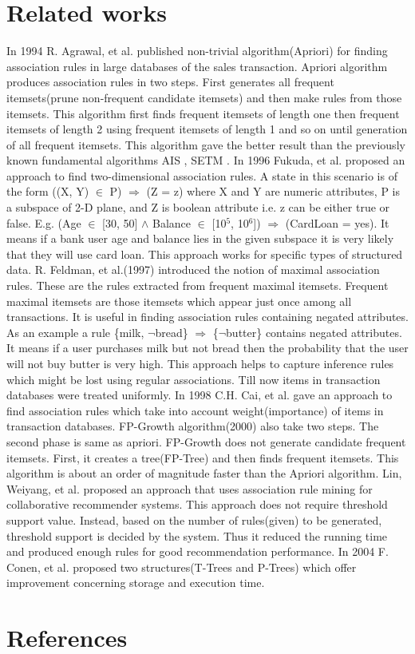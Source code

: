 \documentclass[review]{elsarticle}
\begin{document}
\section{Related works}
In 1994 R. Agrawal, et al. published non-trivial algorithm(Apriori) \cite{fastapriori} for finding association rules in large databases of the sales transaction. Apriori algorithm produces association rules in two steps. First generates all frequent itemsets(prune non-frequent candidate itemsets) and then make rules from those itemsets. This algorithm first finds frequent itemsets of length one then frequent itemsets of length 2 using frequent itemsets of length 1 and so on until generation of all frequent itemsets. This algorithm gave the better result than the previously known fundamental algorithms AIS \cite{ais}, SETM \citep{setm}. In 1996 Fukuda, et al. \cite{2darules} proposed an approach to find two-dimensional association rules. A state in this scenario is of the form ((X, Y) $\in$ P) $\Rightarrow$ (Z = z) where X and Y are numeric attributes, P is a subspace of 2-D plane, and Z is boolean attribute i.e. z can be either true or false. E.g. (Age $\in$ [30, 50] $\wedge$ Balance $\in$ [10$^{5}$, 10$^{6}$]) $\Rightarrow$ (CardLoan = yes). It means if a bank user age and balance lies in the given subspace it is very likely that they will use card loan. This approach works for specific types of structured data. R. Feldman, et al.(1997) \cite{massociation} introduced the notion of maximal association rules. These are the rules extracted from frequent maximal itemsets. Frequent maximal itemsets are those itemsets which appear just once among all transactions. It is useful in finding association rules containing negated attributes. As an example a rule \{milk, $\neg$bread\} $\Rightarrow$ \{$\neg$butter\} contains negated attributes. It means if a user purchases milk but not bread then the probability that the user will not buy butter is very high. This approach helps to capture inference rules which might be lost using regular associations. Till now items in transaction databases were treated uniformly. In 1998 C.H. Cai, et al. \cite{weightedassociation} gave an approach to find association rules which take into account weight(importance) of items in transaction databases. FP-Growth algorithm(2000) \cite{fpgrowth} also take two steps. The second phase is same as apriori. FP-Growth does not generate candidate frequent itemsets. First, it creates a tree(FP-Tree) and then finds frequent itemsets. This algorithm is about an order of magnitude faster than the Apriori algorithm. Lin, Weiyang, et al. \cite{Lin2002} proposed an approach that uses association rule mining for collaborative recommender systems. This approach does not require threshold support value. Instead, based on the number of rules(given) to be generated, threshold support is decided by the system. Thus it reduced the running time and produced enough rules for good recommendation performance. In 2004 F. Conen, et al. \cite{ptree} proposed two structures(T-Trees and P-Trees) which offer improvement concerning storage and execution time.

\section*{References}


\end{document}
